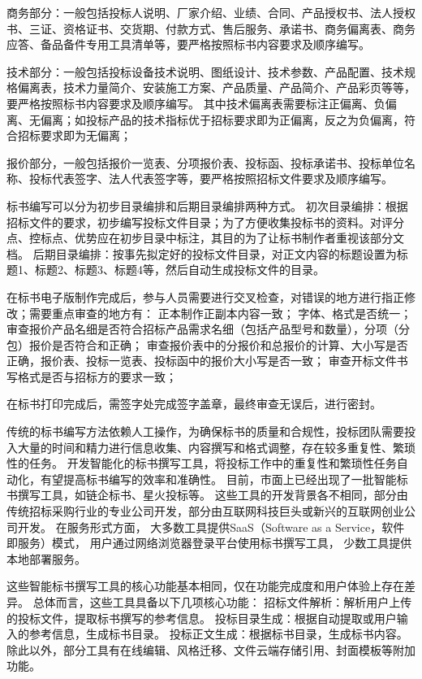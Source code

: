 \documentclass{xmu}
\begin{document}
商务部分：一般包括投标人说明、厂家介绍、业绩、合同、产品授权书、法人授权书、三证、资格证书、交货期、付款方式、售后服务、承诺书、商务偏离表、商务应答、备品备件专用工具清单等，要严格按照标书内容要求及顺序编写。

技术部分：一般包括投标设备技术说明、图纸设计、技术参数、产品配置、技术规格偏离表，技术力量简介、安装施工方案、产品质量、产品简介、产品彩页等等，要严格按照标书内容要求及顺序编写。
其中技术偏离表需要标注正偏离、负偏离、无偏离；如投标产品的技术指标优于招标要求即为正偏离，反之为负偏离，符合招标要求即为无偏离；

报价部分，一般包括报价一览表、分项报价表、投标函、投标承诺书、投标单位名称、投标代表签字、法人代表签字等，要严格按照招标文件要求及顺序编写。
\par
标书编写可以分为初步目录编排和后期目录编排两种方式。
初次目录编排：根据招标文件的要求，初步编写投标文件目录；为了方便收集投标书的资料。对评分点、控标点、优势应在初步目录中标注，其目的为了让标书制作者重视该部分文档。
后期目录编排：按事先拟定好的投标文件目录，对正文内容的标题设置为标题1、标题2、标题3、标题4等，然后自动生成投标文件的目录。
\par
在标书电子版制作完成后，参与人员需要进行交叉检查，对错误的地方进行指正修改；需要重点审查的地方有：
正本制作正副本内容一致；
字体、格式是否统一；
审查报价产品名细是否符合招标产品需求名细（包括产品型号和数量），分项（分包）报价是否符合和正确；
审查报价表中的分报价和总报价的计算、大小写是否正确，报价表、投标一览表、投标函中的报价大小写是否一致；
审查开标文件书写格式是否与招标方的要求一致；
\par
在标书打印完成后，需签字处完成签字盖章，最终审查无误后，进行密封。
\par
传统的标书编写方法依赖人工操作，为确保标书的质量和合规性，投标团队需要投入大量的时间和精力进行信息收集、内容撰写和格式调整，存在较多重复性、繁琐性的任务。
开发智能化的标书撰写工具，将投标工作中的重复性和繁琐性任务自动化，有望提高标书编写的效率和准确性。
目前，市面上已经出现了一批智能标书撰写工具，如链企标书、星火投标等。
这些工具的开发背景各不相同，部分由传统招标采购行业的专业公司开发，部分由互联网科技巨头或新兴的互联网创业公司开发。
在服务形式方面，
大多数工具提供SaaS（Software as a Service，软件即服务）模式，
用户通过网络浏览器登录平台使用标书撰写工具，
少数工具提供本地部署服务。

这些智能标书撰写工具的核心功能基本相同，仅在功能完成度和用户体验上存在差异。
总体而言，这些工具具备以下几项核心功能：
招标文件解析：解析用户上传的投标文件，提取标书撰写的参考信息。
投标目录生成：根据自动提取或用户输入的参考信息，生成标书目录。
投标正文生成：根据标书目录，生成标书内容。
除此以外，部分工具有在线编辑、风格迁移、文件云端存储引用、封面模板等附加功能。
\end{document}
